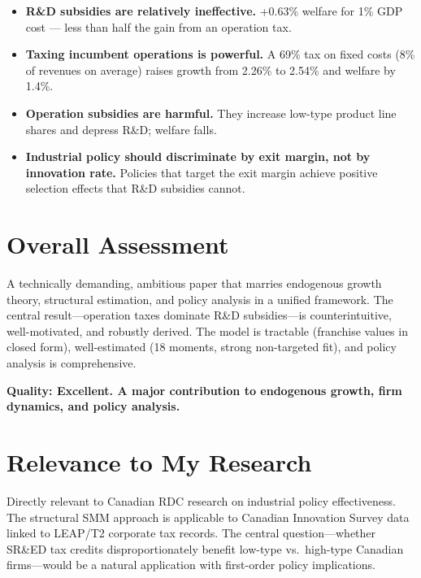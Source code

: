 \begin{itemize}
  \item \textbf{R\&D subsidies are relatively ineffective.} +0.63\%
    welfare for 1\% GDP cost --- less than half the gain from an
    operation tax.
  \item \textbf{Taxing incumbent operations is powerful.} A 69\% tax on
    fixed costs (8\% of revenues on average) raises growth from 2.26\%
    to 2.54\% and welfare by 1.4\%.
  \item \textbf{Operation subsidies are harmful.} They increase low-type
    product line shares and depress R\&D; welfare falls.
  \item \textbf{Industrial policy should discriminate by exit margin, not
    by innovation rate.} Policies that target the exit margin achieve
    positive selection effects that R\&D subsidies cannot.
\end{itemize}

\section{Overall Assessment}

A technically demanding, ambitious paper that marries endogenous growth theory,
structural estimation, and policy analysis in a unified framework. The central
result---operation taxes dominate R\&D subsidies---is counterintuitive,
well-motivated, and robustly derived. The model is tractable (franchise values
in closed form), well-estimated (18 moments, strong non-targeted fit), and
policy analysis is comprehensive.

\textbf{Quality: Excellent. A major contribution to endogenous growth, firm
dynamics, and policy analysis.}

\section{Relevance to My Research}

Directly relevant to Canadian RDC research on industrial policy effectiveness.
The structural SMM approach is applicable to Canadian Innovation Survey data
linked to LEAP/T2 corporate tax records. The central question---whether SR\&ED
tax credits disproportionately benefit low-type vs.\ high-type Canadian
firms---would be a natural application with first-order policy implications.


